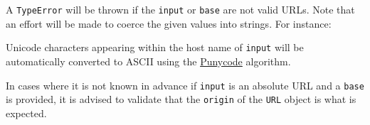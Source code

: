\begin{Shaded}
\begin{Highlighting}[]
\OperatorTok{===} \NormalTok{(}\NormalTok{)}\NormalTok{)}\OperatorTok{;} 
\end{Highlighting}
\end{Shaded}

A \texttt{TypeError} will be thrown if the \texttt{input} or
\texttt{base} are not valid URLs. Note that an effort will be made to
coerce the given values into strings. For instance:

\begin{Shaded}
\begin{Highlighting}[]
\OperatorTok{=}  \NormalTok{(\{ }\OperatorTok{:}\NormalTok{ () }\KeywordTok{=\textgreater{}} \NormalTok{ \})}\OperatorTok{;}
\end{Highlighting}
\end{Shaded}

Unicode characters appearing within the host name of \texttt{input} will
be automatically converted to ASCII using the
\href{https://tools.ietf.org/html/rfc5891\#section-4.4}{Punycode}
algorithm.

\begin{Shaded}
\begin{Highlighting}[]
\OperatorTok{=}  \NormalTok{(}\NormalTok{)}\OperatorTok{;}
\end{Highlighting}
\end{Shaded}

In cases where it is not known in advance if \texttt{input} is an
absolute URL and a \texttt{base} is provided, it is advised to validate
that the \texttt{origin} of the \texttt{URL} object is what is expected.

